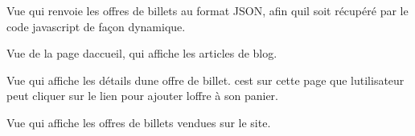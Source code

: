 \documentclass[letterpaper,10pt,english]{sphinxmanual}
\begin{document}

\begin{fulllineitems}
\label{\detokenize{store:store.views.get_offers_data}}
\pysigstartsignatures
{}
\pysigstopsignatures
\sphinxAtStartPar
Vue qui renvoie les offres de billets au format JSON, afin qu\textquotesingle{}il soit récupéré par le code javascript de façon dynamique.

\end{fulllineitems}


\begin{fulllineitems}
\label{\detokenize{store:store.views.index}}
\pysigstartsignatures
{}
\pysigstopsignatures
\sphinxAtStartPar
Vue de la page d\textquotesingle{}accueil, qui affiche les articles de blog.

\end{fulllineitems}


\begin{fulllineitems}
\label{\detokenize{store:store.views.offer_detail}}
\pysigstartsignatures
{}
\pysigstopsignatures
\sphinxAtStartPar
Vue qui affiche les détails d\textquotesingle{}une offre de billet. c\textquotesingle{}est sur cette page que l\textquotesingle{}utilisateur peut cliquer sur le lien pour ajouter l\textquotesingle{}offre à son panier.

\end{fulllineitems}


\begin{fulllineitems}
\label{\detokenize{store:store.views.offers}}
\pysigstartsignatures
{}
\pysigstopsignatures
\sphinxAtStartPar
Vue qui affiche les offres de billets vendues sur le site.

\end{fulllineitems}
\end{document}
